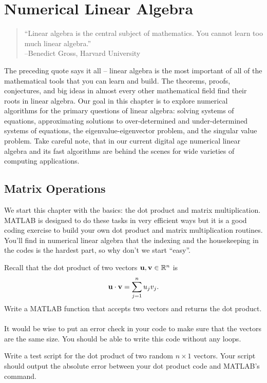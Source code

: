 \chapter{Numerical Linear Algebra}
\begin{quote}
    ``Linear algebra is the central subject of mathematics.  You cannot learn too much
    linear algebra.''\\--Benedict Gross, Harvard University
\end{quote}

The preceding quote says it all -- linear algebra is the most important of all of the
mathematical tools that you can learn and build.  The theorems, proofs, conjectures, and
big ideas in almost every other mathematical field find their roots in linear algebra.
Our goal in this chapter is to explore numerical algorithms for the primary questions of
linear algebra: solving systems of equations, approximating solutions to over-determined
and under-determined systems of equations, the eigenvalue-eigenvector problem, and the
singular value problem. Take careful note, that in our current digital age numerical
linear algebra and its fast algorithms are behind the scenes for wide varieties of
computing applications. 


\section{Matrix Operations}
We start this chapter with the basics: the dot product and matrix multiplication.  MATLAB
is designed to do these tasks in very efficient ways but it is a good coding exercise to
build your own dot product and matrix multiplication routines.  You'll find in numerical
linear algebra that the indexing and the housekeeping in the codes is the hardest part, so
why don't we start ``easy''.

\begin{problem}
    Recall that the dot product of two vectors ${\bf u}, {\bf v} \in \mathbb{R}^n$ is 
    \[ {\bf u} \cdot {\bf v} = \sum_{j=1}^n u_j v_j. \]
    Write a MATLAB function that accepts two vectors and returns the dot product. \\
     \\
    It would be wise to put an error check in your code to make sure that the vectors are
    the same size.  You should be able to write this code without any loops.
\end{problem}

\begin{problem}
    Write a test script for the dot product of two random $n \times 1$ vectors.  Your
    script should output the absolute error between your dot product code and MATLAB's
    command.
\end{problem}

